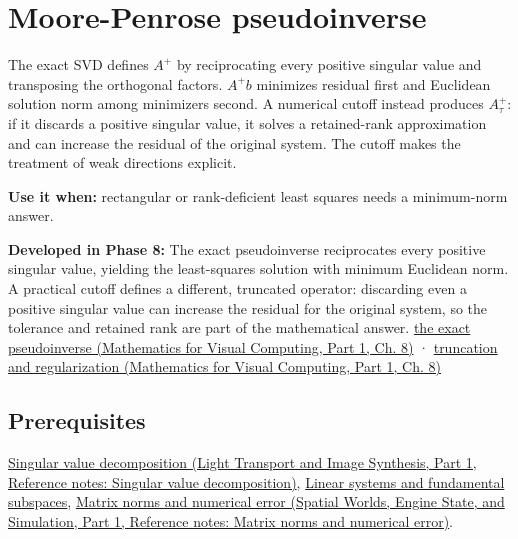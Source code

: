 \hypertarget{appendix-541306fdbc1b}{}\label{referencestart:appendix-541306fdbc1b}
\section{Moore-Penrose pseudoinverse}\label{appendix-541306fdbc1b-moore-penrose-pseudoinverse}

\hypertarget{appendix-541306fdbc1b-moore-penrose-pseudoinverse}{}

The exact SVD defines \(A^+\) by reciprocating every positive singular value and transposing the orthogonal factors. \(A^+b\) minimizes residual first and Euclidean solution norm among minimizers second. A numerical cutoff instead produces \(A_\tau^+\): if it discards a positive singular value, it solves a retained-rank approximation and can increase the residual of the original system. The cutoff makes the treatment of weak directions explicit.

\textbf{Use it when:} rectangular or rank-deficient least squares needs a minimum-norm answer.

\textbf{Developed in Phase 8:} The exact pseudoinverse reciprocates every positive singular value, yielding the least-squares solution with minimum Euclidean norm. A practical cutoff defines a different, truncated operator: discarding even a positive singular value can increase the residual for the original system, so the tolerance and retained rank are part of the mathematical answer. \href{../02-Mathematics-for-Visual-Computing-P01/main.pdf\#nameddest=02-foundations-ii-ch024-the-moorepenrose-inverse-and-its-four-identities}{the exact pseudoinverse (Mathematics for Visual Computing, Part 1, Ch. 8)} · \href{../02-Mathematics-for-Visual-Computing-P01/main.pdf\#nameddest=02-foundations-ii-ch024-thresholding-and-regularization-are-different-choices}{truncation and regularization (Mathematics for Visual Computing, Part 1, Ch. 8)}

\subsection{Prerequisites}\label{appendix-541306fdbc1b-prerequisites}

\hypertarget{appendix-541306fdbc1b-prerequisites}{}

\href{../04-Light-Transport-and-Image-Synthesis-P01/main.pdf\#nameddest=appendix-1fad5e7f36fa}{Singular value decomposition (Light Transport and Image Synthesis, Part 1, Reference notes: Singular value decomposition)}, \hyperref[appendix-8572a4a060c1]{Linear systems and fundamental subspaces}, \href{../05-Spatial-Worlds-Engine-State-and-Simulation-P01/main.pdf\#nameddest=appendix-f8657bac66e5}{Matrix norms and numerical error (Spatial Worlds, Engine State, and Simulation, Part 1, Reference notes: Matrix norms and numerical error)}.

